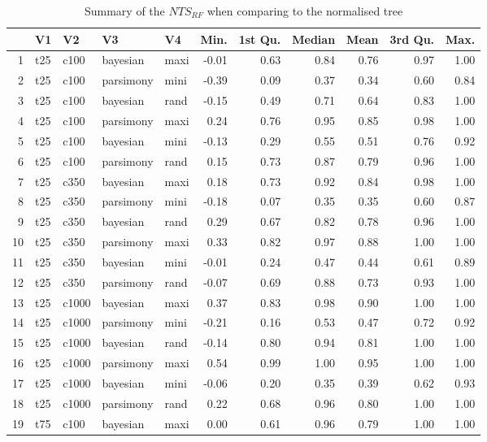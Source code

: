 \documentclass[12pt,letterpaper]{article}
\begin{document}
\begin{longtable}{rllllrrrrrr}
\caption{Summary of the $NTS_{RF}$ when comparing to the normalised tree}\\

  \hline
 & V1 & V2 & V3 & V4 & Min. & 1st Qu. & Median & Mean & 3rd Qu. & Max. \\ 
  \hline
1 & t25 & c100 & bayesian & maxi & -0.01 & 0.63 & 0.84 & 0.76 & 0.97 & 1.00 \\ 
  2 & t25 & c100 & parsimony & mini & -0.39 & 0.09 & 0.37 & 0.34 & 0.60 & 0.84 \\ 
  3 & t25 & c100 & bayesian & rand & -0.15 & 0.49 & 0.71 & 0.64 & 0.83 & 1.00 \\ 
  4 & t25 & c100 & parsimony & maxi & 0.24 & 0.76 & 0.95 & 0.85 & 0.98 & 1.00 \\ 
  5 & t25 & c100 & bayesian & mini & -0.13 & 0.29 & 0.55 & 0.51 & 0.76 & 0.92 \\ 
  6 & t25 & c100 & parsimony & rand & 0.15 & 0.73 & 0.87 & 0.79 & 0.96 & 1.00 \\ 
  7 & t25 & c350 & bayesian & maxi & 0.18 & 0.73 & 0.92 & 0.84 & 0.98 & 1.00 \\ 
  8 & t25 & c350 & parsimony & mini & -0.18 & 0.07 & 0.35 & 0.35 & 0.60 & 0.87 \\ 
  9 & t25 & c350 & bayesian & rand & 0.29 & 0.67 & 0.82 & 0.78 & 0.96 & 1.00 \\ 
  10 & t25 & c350 & parsimony & maxi & 0.33 & 0.82 & 0.97 & 0.88 & 1.00 & 1.00 \\ 
  11 & t25 & c350 & bayesian & mini & -0.01 & 0.24 & 0.47 & 0.44 & 0.61 & 0.89 \\ 
  12 & t25 & c350 & parsimony & rand & -0.07 & 0.69 & 0.88 & 0.73 & 0.93 & 1.00 \\ 
  13 & t25 & c1000 & bayesian & maxi & 0.37 & 0.83 & 0.98 & 0.90 & 1.00 & 1.00 \\ 
  14 & t25 & c1000 & parsimony & mini & -0.21 & 0.16 & 0.53 & 0.47 & 0.72 & 0.92 \\ 
  15 & t25 & c1000 & bayesian & rand & -0.14 & 0.80 & 0.94 & 0.81 & 1.00 & 1.00 \\ 
  16 & t25 & c1000 & parsimony & maxi & 0.54 & 0.99 & 1.00 & 0.95 & 1.00 & 1.00 \\ 
  17 & t25 & c1000 & bayesian & mini & -0.06 & 0.20 & 0.35 & 0.39 & 0.62 & 0.93 \\ 
  18 & t25 & c1000 & parsimony & rand & 0.22 & 0.68 & 0.96 & 0.80 & 1.00 & 1.00 \\ 
  19 & t75 & c100 & bayesian & maxi & 0.00 & 0.61 & 0.96 & 0.79 & 1.00 & 1.00 \\ 

\end{longtable}
\end{document}
